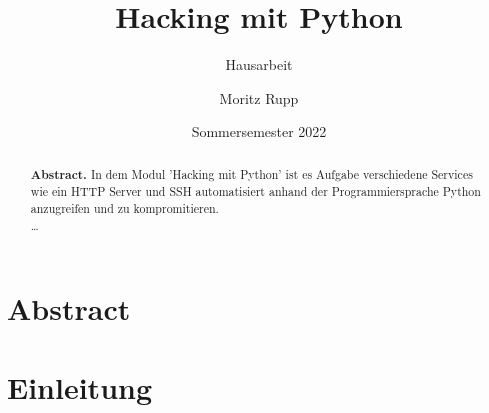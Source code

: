 \documentclass[a4paper,12pt]{scrartcl}
\title{ Hacking mit Python}
\subtitle{Hausarbeit}
\author{Moritz Rupp}
\date{Sommersemester 2022}
\begin{document}
\maketitle
\newpage
\tableofcontents
\newpage
\section{Abstract}
\begin{abstract}
\textbf{Abstract.}
In dem Modul 'Hacking mit Python' ist es Aufgabe verschiedene Services wie ein HTTP Server und SSH automatisiert anhand der Programmiersprache Python anzugreifen und zu kompromitieren.\\
\dots
\end{abstract}
\section{Einleitung}
\end{document}
